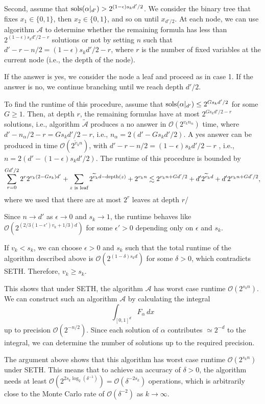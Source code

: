 \documentclass{amsart}[11pt]
\numberwithin{equation}{section}
\numberwithin{theorem}{section}
\begin{document}
 \bigskip
  Second, assume that ${\rm sols}(\alpha|_{d'}) > 2^{(1-\epsilon)s_k d'/2}$. We consider the binary tree that fixes $x_1 \in \{0,1\}$, then $x_2 \in \{0,1\}$, and so on until $x_{d'/2}$. At each node, we can use algorithm $\mathcal{A}$ to determine whether the remaining formula has less than $2^{(1-\epsilon)s_k d'/2 - r}$ solutions or not by setting $n$ such that $d' - r - n/2 = (1-\epsilon)s_k d'/2 - r$, where $r$ is the number of fixed variables at the current node (i.e., the depth of the node). 

If the answer is yes, we consider the node a leaf and proceed as in case 1. If the answer is no, we continue branching until we reach depth $d'/2$. 

To find the runtime of this procedure, assume that ${\rm sols}(\alpha|_{d'}) \leq  2^{Gs_k d'/2}$ for some $G\geq 1$. Then, at depth $r$,
the remaining formulas have at most $2^{Gs_k d'/2 - r}$ solutions, i.e., algorithm $\widetilde{\mathcal{A}}$ produces a no answer in $\mathcal{O}(2^{v_kn_\alpha})$ time, where  $d'-n_\alpha/2 -r  = Gs_k d'/2 - r$, i.e., $n_\alpha = 2(d' - Gs_k d'/2)$. A yes answer can be produced in time $\mathcal{O}(2^{\widetilde v_k n})$, with
$d' - r - n/2 = (1-\epsilon)s_k d'/2 - r$ , i.e., $n = 2(d' - (1-\epsilon)s_k d'/2)$.
The runtime of this procedure is bounded by
\begin{equation}
\sum_{r=0}^{G d'/2} 2^r2^{v_k (2-Gs_k)d'} + \sum_{z\text{ is leaf}} 2^{\widetilde v_kd-{\rm depth}(z)} + 2^{v_k n} \lesssim 2^{v_k n + Gd'/2} + d' 2^{\widetilde v_k d} + d'2^{v_k n + Gd'/2},
\end{equation}
where we used that there are at most $2^r$ leaves at depth $r$/

Since $n \to d'$ as $\epsilon \to 0$ and $s_k \to 1$, the runtime behaves like $\mathcal{O}(2^{(2/3(1-\epsilon')v_k + 1/3)d})$ for some $\epsilon' > 0$ depending only on $\epsilon$ and $s_k$. 

If $v_k < s_k$, we can choose $\epsilon > 0$ and $s_k$ such that the total runtime of the algorithm described above is $\mathcal{O}(2^{(1-\delta)s_k d})$ for some $\delta > 0$, which contradicts SETH. Therefore, $v_k \ge s_k$.

This shows that under SETH, the algorithm $\mathcal{A}$ has worst case runtime $\mathcal{O}(2^{s_k n})$. We can construct such an algorithm $\mathcal{A}$ by calculating the integral
\begin{equation}
\int_{[0,1]^d} F_{\alpha} \, dx
\end{equation}
up to precision $\mathcal{O}(2^{-n/2})$. Since each solution of $\alpha$ contributes $\simeq 2^{-d}$ to the integral, we can determine the number of solutions up to the required precision. 

The argument above shows that this algorithm has worst case runtime $\mathcal{O}(2^{s_k n})$ under SETH. This means that to achieve an accuracy of $\delta > 0$, the algorithm needs at least $\mathcal{O}(2^{2s_k \log_2(\delta^{-1})}) = \mathcal{O}(\delta^{-2s_k})$ operations, which is arbitrarily close to the Monte Carlo rate of $\mathcal{O}(\delta^{-2})$ as $k \to \infty$.


\printbibliography
\end{document}
